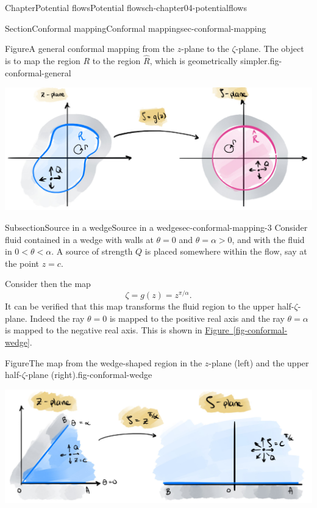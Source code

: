 \documentclass[oneside,10pt,]{book}
\newcommand{\xreffont}{\relax}
\numberwithin{equation}{section}
\begin{document}
\begin{chapterptx}{Chapter}{Potential flows}{}{Potential flows}{}{}{ch-chapter04-potentialflows}
\begin{sectionptx}{Section}{Conformal mapping}{}{Conformal mapping}{}{}{sec-conformal-mapping}
\begin{introduction}{}
\begin{figureptx}{Figure}{A general conformal mapping from the \(z\)-plane to the \(\zeta\)-plane. The object is to map the region \(R\) to the region \(\hat{R}\), which is geometrically simpler.}{fig-conformal-general}{}
\begin{image}{0}{1}{0}{}
\includegraphics[width=\linewidth]{external/conformal_generalmap.jpg}
\end{image}%
\tcblower
\end{figureptx}%
\end{introduction}%
%
%
\typeout{************************************************}
\typeout{************************************************}
%
\begin{subsectionptx}{Subsection}{Source in a wedge}{}{Source in a wedge}{}{}{sec-conformal-mapping-3}
Consider fluid contained in a wedge with walls at \(\theta = 0\) and \(\theta = \alpha > 0\), and with the fluid in \(0 < \theta < \alpha\). A source of strength \(Q\) is placed somewhere within the flow, say at the point \(z = c\).%
\par
Consider then the map%
\begin{equation}
\zeta = g(z) = z^{\pi/\alpha}.\label{eqn-conformal-wedge-map}
\end{equation}
It can be verified that this map transforms the fluid region to the upper half-\(\zeta\)-plane. Indeed the ray \(\theta = 0\) is mapped to the positive real axis and the ray \(\theta = \alpha\) is mapped to the negative real axis. This is shown in \hyperref[fig-conformal-wedge]{Figure~{\xreffont\ref{fig-conformal-wedge}}}.%
\begin{figureptx}{Figure}{The map from the wedge-shaped region in the \(z\)-plane (left) and the upper half-\(\zeta\)-plane (right).}{fig-conformal-wedge}{}%
\begin{image}{0}{1}{0}{}%
\includegraphics[width=\linewidth]{external/conformal_wedge.jpg}

\end{image}
\end{figureptx}
\end{subsectionptx}
\end{sectionptx}
\end{chapterptx}
\end{document}

